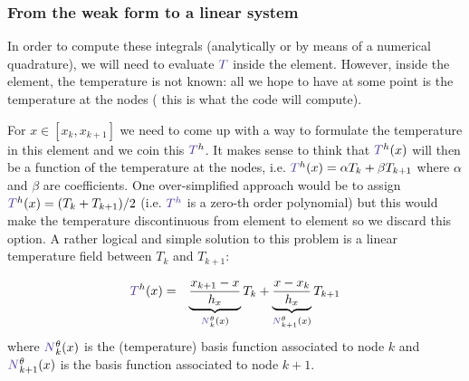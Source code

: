 \subsubsection{From the weak form to a linear system}

In order to compute these integrals (analytically or by means of a numerical quadrature), 
we will need to evaluate ${\color{Violet}T}$ inside the element. However, inside the element, 
the temperature is not known: all we hope to have at some point is the temperature at the nodes (
this is what the code will compute). 

For $x\in [x_k,x_{k+1}]$ we need to come up with a way to formulate the temperature in this element and 
we coin this ${\color{Violet}T}^h$.  
It makes sense to think that ${\color{Violet}T}^h(x)$ will then be a function of the temperature at the nodes, 
i.e. ${\color{Violet}T}^h(x) = \alpha T_k + \beta T_{k+1}$ where $\alpha$ and $\beta$ are coefficients. 
One over-simplified approach would be to assign ${\color{Violet}T}^h(x)=(T_k + T_{k+1})/2$ 
(i.e. ${\color{Violet}T^h}$ is a zero-th order polynomial) but this would make the
temperature discontinuous from element to element so we discard this option. 
A rather logical and simple solution to this problem is a linear temperature field between $T_k$
and $T_{k+1}$: 

\begin{eqnarray}
{\color{Violet}T}^h(x) 
&=& \underbrace{\frac{x_{k+1}-x}{h_x}}_{{\color{Violet}N}_k^\theta(x)} T_k 
+ 
\underbrace{\frac{x-x_k}{h_x}}_{{\color{Violet}N}_{k+1}^\theta(x)} T_{k+1} \nn
\end{eqnarray}
where ${\color{Violet}N}_k^\theta(x)$ is the (temperature) basis function associated to node $k$ and 
${\color{Violet}N}_{k+1}^\theta(x)$ is the basis function associated to node $k+1$.

